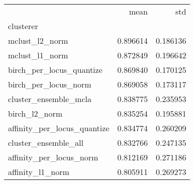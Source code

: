 \begin{tabular}{lrr}
\toprule
{} &      mean &       std \\
clusterer                   &           &           \\
\midrule
mclust\_l2\_norm              &  0.896614 &  0.186136 \\
mclust\_l1\_norm              &  0.872849 &  0.196642 \\
birch\_per\_locus\_quantize    &  0.869840 &  0.170125 \\
birch\_per\_locus\_norm        &  0.869058 &  0.173117 \\
cluster\_ensemble\_mcla       &  0.838775 &  0.235953 \\
birch\_l2\_norm               &  0.835254 &  0.195881 \\
affinity\_per\_locus\_quantize &  0.834774 &  0.260209 \\
cluster\_ensemble\_all        &  0.832766 &  0.247135 \\
affinity\_per\_locus\_norm     &  0.812169 &  0.271186 \\
affinity\_l1\_norm            &  0.805911 &  0.269273 \\
\bottomrule
\end{tabular}

